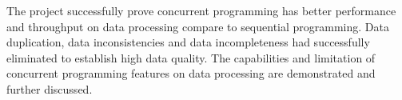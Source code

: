 \documentclass[12pt, oneside]{Thesis}
\begin{document}
The project successfully prove concurrent programming has better performance and throughput on data processing compare to sequential programming. Data duplication, data inconsistencies and data incompleteness had successfully eliminated to establish high data quality. The capabilities and limitation of concurrent programming features on data processing are demonstrated and further discussed.


\clearpage %
\pagebreak

\mainmatter 

\pagestyle{fancy} 

\raggedright




\clearpage

\singlespacing
\label{Bibliography}


 

 


\appendix
\appendixpage
\addappheadtotoc

\singlespacing  %










%
%

\backmatter
\end{document}
